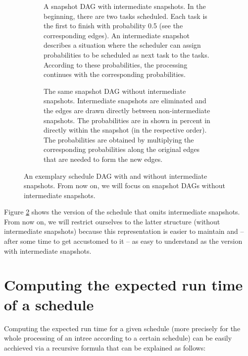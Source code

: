\begin{figure}[th]
  \centering
  \begin{subfigure}{\textwidth}
    \centering
    
    \caption{A snapshot DAG with intermediate snapshots. In the beginning, there are two tasks scheduled. Each task is the first to finish with probability 0.5 (see the corresponding edges). An intermediate snapshot describes a situation where the scheduler can assign probabilities to be scheduled as next task to the tasks. According to these probabilities, the processing continues with the corresponding probabilities.}
  \label{fig:schedule-dag-intro-intermediates}
  \end{subfigure}
  \begin{subfigure}{\textwidth}
    \centering
    
    \caption{The same snapshot DAG without intermediate snapshots. Intermediate snapshots are eliminated and the edges are drawn directly between non-intermediate snapshots. The probabilities are in shown in percent in directly within the snapshot (in the respective order). The probabilities are obtained by multiplying the corresponding probabilities along the original edges that are needed to form the new edges.}
  \label{fig:schedule-dag-intro-no-intermediates}
  \end{subfigure}
  \caption{An exemplary schedule DAG with and without intermediate snapshots. From now on, we will focus on snapshot DAGs without intermediate snapshots.}
  \label{fig:schedule-dag-intro}
\end{figure}

Figure \ref{fig:schedule-dag-intro-no-intermediates} shows the version of the schedule that omits intermediate snapshots. From now on, we will restrict ourselves to the latter structure (without intermediate snapshots) because this representation is easier to maintain and -- after some time to get accustomed to it -- as easy to understand as the version with intermediate snapshots.

\section{Computing the expected run time of a schedule}
\label{sec:introduction-compute-expected-time-schedule}

Computing the expected run time for a given schedule (more precisely for the whole processing of an intree according to a certain schedule) can be easily acchieved via a recursive formula that can be explained as follows:

